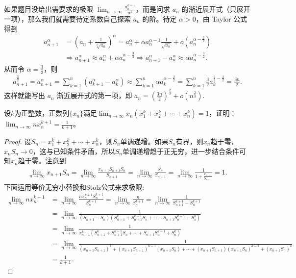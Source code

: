 \documentclass[../../main.tex]{subfiles}
\begin{document}
\begin{remark}
如果题目没给出需要求的极限 \(\lim_{n\rightarrow \infty} \frac{a_{n}^{k + 1}}{n^k}\)，而是问求 \(a_n\) 的渐近展开式（只展开一项），那么我们就需要待定系数自己探索 \(a_n\) 的阶。待定 \(\alpha>0\)，由 Taylor 公式得到
\begin{align*}
a_{n + 1}^{\alpha}&=\left(a_n+\frac{1}{\sqrt[k]{a_n}}\right)^{\alpha}
=a_n^{\alpha}+\alpha a_n^{\alpha - 1}\frac{1}{\sqrt{a_n}}+o\left(a_n^{\alpha - \frac{3}{2}}\right)\\
&\Rightarrow a_{n + 1}^{\alpha}\approx a_n^{\alpha}+\alpha a_n^{\alpha - \frac{3}{2}}
\Rightarrow a_{n + 1}^{\alpha}-a_n^{\alpha}\approx \alpha a_n^{\alpha - \frac{3}{2}}.
\end{align*}
从而令 \(\alpha = \frac{3}{2}\)，则
\begin{align*}
a_{n + 1}^{\frac{3}{2}}=a_{n + 1}^{\alpha}
=\sum_{k = 1}^n\left(a_{k + 1}^{\alpha}-a_{k}^{\alpha}\right)
\approx \sum_{k = 1}^n\alpha a_{k}^{\alpha - \frac{3}{2}}
=\sum_{k = 1}^n\frac{3}{2}a_{k}^{\frac{3}{2}-\frac{3}{2}}
=\frac{3n}{2}.
\end{align*}
这样就能写出 \(a_n\) 渐近展开式的第一项，即 \(a_n=\left(\frac{3n}{2}\right)^{\frac{2}{3}}+o\left(n^{\frac{2}{3}}\right)\).
\end{remark}

\begin{example}
设\(k\)为正整数，正数列\(\{x_n\}\)满足\(\lim_{n\rightarrow\infty}x_n(x_1^k + x_2^k+\cdots+x_n^k)=1\)，证明：\(\lim_{n\rightarrow\infty}nx_n^{k + 1}=\frac{1}{k + 1}\)。
\end{example}
\begin{proof}
设\(S_n = x_1^k + x_2^k+\cdots+x_n^k\)，则\(S_n\)单调递增。如果\(S_n\)有界，则\(x_n\)趋于零，\(x_nS_n\rightarrow0\)，这与已知条件矛盾，所以\(S_n\)单调递增趋于正无穷，进一步结合条件可知\(x_n\)趋于零。注意到
\begin{align*}
\lim_{n\rightarrow\infty}x_{n + 1}S_n=\lim_{n\rightarrow\infty}\frac{x_{n + 1}S_{n + 1}S_n}{S_{n + 1}}=\lim_{n\rightarrow\infty}\frac{S_n}{S_{n + 1}}=\lim_{n\rightarrow\infty}\frac{1}{1+\frac{x_{n + 1}}{S_{n + 1}}}=1.
\end{align*}
下面运用等价无穷小替换和Stolz公式来求极限:
\begin{align*}
\lim_{n\rightarrow\infty}nx_n^{k + 1}&=\lim_{n\rightarrow\infty}\frac{nx_n^{k + 1}S_n^{k + 1}}{S_n^{k + 1}}=\lim_{n\rightarrow\infty}\frac{n}{S_n^{k + 1}}=\lim_{n\rightarrow\infty}\frac{1}{S_{n + 1}^{k + 1}-S_n^{k + 1}}\\
&=\lim_{n\rightarrow\infty}\frac{1}{(S_{n + 1}-S_n)(S_{n + 1}^k + S_{n + 1}^{k - 1}S_n+\cdots+S_{n + 1}S_n^{k - 1}+S_n^k)}\\
&=\lim_{n\rightarrow\infty}\frac{1}{x_{n + 1}^{k}(S_{n + 1}^k + S_{n + 1}^{k - 1}S_n+\cdots+S_{n + 1}S_n^{k - 1}+S_n^k)}\\
&=\lim_{n\rightarrow\infty}\frac{1}{(x_{n + 1}S_{n + 1})^k+(x_{n + 1}S_{n + 1})^{k - 1}(x_{n + 1}S_n)+\cdots+(x_{n + 1}S_{n + 1})(x_{n + 1}S_n)^{k - 1}+(x_{n + 1}S_n)^k}\\
&=\frac{1}{k + 1}.
\end{align*}
\end{proof}
\end{document}
